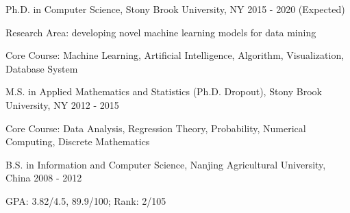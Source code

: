 


\begin{cventries}


\eduentry
{Ph.D. in Computer Science, Stony Brook University, NY} %
{2015 - 2020 (Expected)} %
{ %
\begin{cvitems}
\item {Research Area: developing novel machine learning models for data mining }
\item {Core Course: Machine Learning, Artificial Intelligence, Algorithm, Visualization, Database System}
\end{cvitems}
}


\eduentry
{M.S. in Applied Mathematics and Statistics (Ph.D. Dropout), Stony Brook University, NY} %
{2012 - 2015} %
{ %
\begin{cvitems}
\item {Core Course: Data Analysis, Regression Theory, Probability, Numerical Computing, Discrete Mathematics}
\end{cvitems}
}



\eduentry
{B.S. in Information and Computer Science, Nanjing Agricultural University, China} %
{2008 - 2012} %
{ %
\begin{cvitems}
\item {GPA: 3.82/4.5, 89.9/100; Rank: 2/105}
\end{cvitems}
}



\end{cventries}